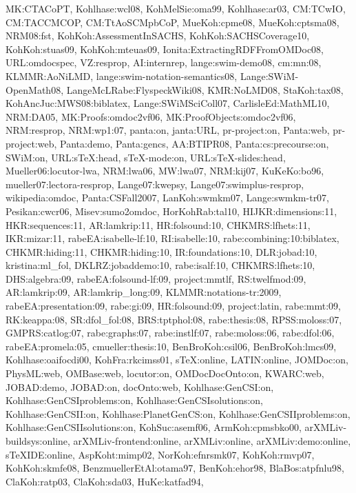 {MK:CTACoPT,%
Kohlhase:wcl08,%
KohMelSie:oma99,%
Kohlhase:ar03,%
CM:TCwIO,%
CM:TACCMCOP,%
CM:TtAoSCMpbCoP,%
MueKoh:cpme08,%
MueKoh:cptsma08,%
NRM08:fst,%
KohKoh:AssessmentInSACHS,%
KohKoh:SACHSCoverage10,%
KohKoh:stuas09,%
KohKoh:mteuas09,%
Ionita:ExtractingRDFFromOMDoc08,%
URL:omdocspec,%
VZ:resprop,%
AI:internrep,%
lange:swim-demo08,%
cm:mn:08,%
KLMMR:AoNiLMD,%
lange:swim-notation-semantics08,%
Lange:SWiM-OpenMath08,%
LangeMcLRabe:FlyspeckWiki08,%
KMR:NoLMD08,%
StaKoh:tax08,%
KohAncJuc:MWS08:biblatex,%
Lange:SWiMSciColl07,%
CarlisleEd:MathML10,%
NRM:DA05,%
MK:Proofs:omdoc2vf06,%
MK:ProofObjects:omdoc2vf06,%
NRM:resprop,%
NRM:wp1:07,%
panta:on,%
janta:URL,%
pr-project:on,%
Panta:web,%
pr-project:web,%
Panta:demo,%
Panta:gencs,%
AA:BTIPR08,%
Panta:cs:precourse:on,%
SWiM:on,%
URL:sTeX:head,%
sTeX-mode:on,%
URL:sTeX-slides:head,%
Mueller06:locutor-lwa,%
NRM:lwa06,%
MW:lwa07,%
NRM:kij07,%
KuKeKo:bo96,%
mueller07:lectora-resprop,%
Lange07:kwepsy,%
Lange07:swimplus-resprop,%
wikipedia:omdoc,%
Panta:CSFall2007,%
LanKoh:swmkm07,%
Lange:swmkm-tr07,%
Pesikan:cwcr06,%
Misev:sumo2omdoc,%
HorKohRab:tal10,%
HIJKR:dimensions:11,%
HKR:sequences:11,%
AR:lamkrip:11,%
HR:folsound:10,%
CHKMRS:lfhets:11,%
IKR:mizar:11,%
rabeEA:isabelle-lf:10,%
RI:isabelle:10,%
rabe:combining:10:biblatex,%
CHKMR:hiding:11,%
CHKMR:hiding:10,%
IR:foundations:10,%
DLR:jobad:10,%
kristina:ml_fol,%
DKLRZ:jobaddemo:10,%
rabe:isalf:10,%
CHKMRS:lfhets:10,%
DHS:algebra:09,%
rabeEA:folsound-lf:09,%
project:mmtlf,%
RS:twelfmod:09,%
AR:lamkrip:09,%
AR:lamkrip_long:09,%
KLMMR:notations-tr:2009,%
rabeEA:presentation:09,%
rabe:gi:09,%
HR:folsound:09,%
project:latin,%
rabe:mmt:09,%
RK:keappa:08,%
SR:dfol_fol:08,%
BRS:tptphol:08,%
rabe:thesis:08,%
RPSS:moloss:07,%
GMPRS:catlog:07,%
rabe:graphs:07,%
rabe:instlf:07,%
rabe:moloss:06,%
rabe:dfol:06,%
rabeEA:promela:05,%
cmueller:thesis:10,%
BenBroKoh:csil06,%
BenBroKoh:lmcs09,%
Kohlhase:oaifocdi00,%
KohFra:rkcimss01,%
sTeX:online,%
LATIN:online,%
JOMDoc:on,%
PhysML:web,%
OMBase:web,%
locutor:on,%
OMDocDocOnto:on,%
KWARC:web,%
JOBAD:demo,%
JOBAD:on,%
docOnto:web,%
Kohlhase:GenCSI:on,%
Kohlhase:GenCSIproblems:on,%
Kohlhase:GenCSIsolutions:on,%
Kohlhase:GenCSII:on,%
Kohlhase:PlanetGenCS:on,%
Kohlhase:GenCSIIproblems:on,%
Kohlhase:GenCSIIsolutions:on,%
KohSuc:asemf06,%
ArmKoh:cpmsbko00,%
arXMLiv-buildsys:online,%
arXMLiv-frontend:online,%
arXMLiv:online,%
arXMLiv:demo:online,%
sTeXIDE:online,%
AspKoht:mimp02,%
NorKoh:efnrsmk07,%
KohKoh:rmvp07,%
KohKoh:skmfe08,%
BenzmuellerEtAl:otama97,%
BenKoh:ehor98,%
BlaBos:atpfnlu98,%
ClaKoh:ratp03,%
ClaKoh:sda03,%
HuKe:katfad94,%
}
